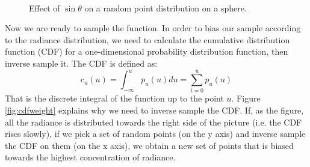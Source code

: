 \begin{figure}[!ht]
\centering
{}
 \\
\caption{Effect of $\sin\theta$ on a random point distribution on a sphere.}
\label{fig:randomsamplingsphere}
\end{figure}
Now we are ready to sample the function. In order to bias our sample according to the radiance distribution, we need to calculate the cumulative distribution function (CDF) for a one-dimensional probability distribution function, then inverse sample it. The CDF is defined as:
$$
c_u(u) = \int_{-\infty}^{u} p_u(u) du = \sum_{i=0}^u p_u(u)
$$
That is the discrete integral of the function up to the point $u$. Figure \ref{fig:cdfweight} explains why we need to inverse sample the CDF. If, as the figure, all the radiance is distributed towards the right side of the picture (i.e. the CDF rises slowly), if we pick a set of random points (on the y axis) and inverse sample the CDF on them (on the x axis), we obtain a new set of points that is biased towards the highest concentration of radiance.
